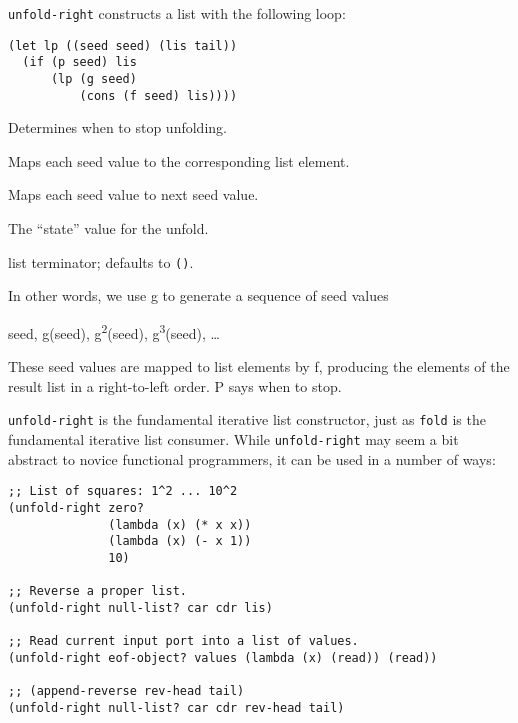 \begin{entry}{%
  }

  \texttt{unfold-right} constructs a list with the following
  loop:

\begin{verbatim}
(let lp ((seed seed) (lis tail))
  (if (p seed) lis
      (lp (g seed)
          (cons (f seed) lis))))
\end{verbatim}

\begin{description}
  \tightlist
\item[ p ] Determines when to stop unfolding.
\item[ f ] Maps each seed value to the corresponding list element.
\item[ g ] Maps each seed value to next seed value.
\item[ seed ] The ``state'' value for the unfold.
\item[ tail ] list terminator; defaults to
  \texttt{\textquotesingle{}()}.
\end{description}

In other words, we use g to generate a sequence of seed values

seed, g(seed), g\textsuperscript{2}(seed), g\textsuperscript{3}(seed),
\ldots{}

These seed values are mapped to list elements by f, producing the
elements of the result list in a right-to-left order. P says when to
stop.

\texttt{unfold-right} is the fundamental iterative list constructor,
just as \texttt{fold} is the fundamental iterative list
consumer. While \texttt{unfold-right} may seem a bit abstract to
novice functional programmers, it can be used in a number of ways:

\begin{verbatim}
;; List of squares: 1^2 ... 10^2
(unfold-right zero? 
              (lambda (x) (* x x))
              (lambda (x) (- x 1))
              10)
    
;; Reverse a proper list.
(unfold-right null-list? car cdr lis)

;; Read current input port into a list of values.
(unfold-right eof-object? values (lambda (x) (read)) (read))

;; (append-reverse rev-head tail)
(unfold-right null-list? car cdr rev-head tail)
\end{verbatim}


\end{entry}
